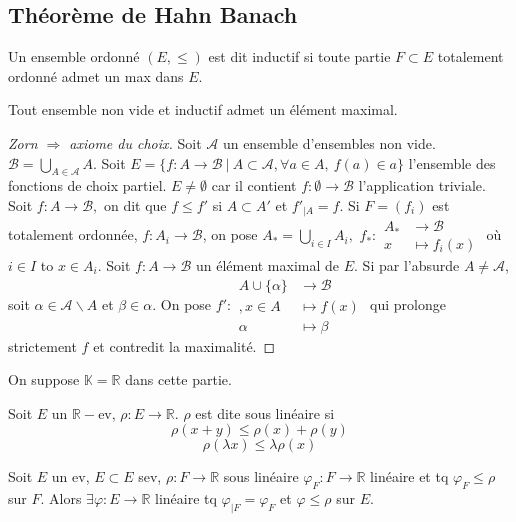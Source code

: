 \subsection{Théorème de Hahn Banach}
\begin{definition}
    Un ensemble ordonné $(E,\le )$ est dit inductif si toute partie $F\subset E$ totalement ordonné admet un max dans $E.$
\end{definition}
\begin{lemme}[Zorn]
    Tout ensemble non vide et inductif admet un élément maximal.
\end{lemme}
\begin{proof}[Zorn $\Rightarrow$ axiome du choix]
    Soit $\mathcal{A}$ un ensemble d'ensembles non vide. $\mathcal{B}=\bigcup\limits_{A\in \mathcal{A}} A$. Soit $E=\{f:A\to \mathcal{B}\ |\ A\subset \mathcal{A},\forall a\in A,\ f(a)\in a \} $ l'ensemble des fonctions de choix partiel. $E\neq \emptyset $ car il contient $f:\emptyset \to \mathcal{B}$ l'application triviale.\\
    Soit $f:A\to \mathcal{B},$ on dit que $f\le f'$ si $A\subset A'$ et $f'_{|A}=f.$ Si $F=\left( f_i \right) $ est totalement ordonnée, $f:A_i\to \mathcal{B}$, on pose $A_*=\bigcup\limits_{i\in I} A_i,$ $f_* :\begin{aligned}
        A_* &\longrightarrow \mathcal{B} \\
        x &\longmapsto f_i(x)
    \end{aligned}$ où $i\in I$ to $x\in A_i.$ Soit $f:A\to \mathcal{B}$ un élément maximal de $E.$ Si par l'absurde $A\neq \mathcal{A}$, soit $\alpha\in \mathcal{A}\backslash A$ et $\beta\in \alpha .$ On pose $f' :\begin{aligned}
        A\cup \{\alpha\}  &\longrightarrow \mathcal{B} \\
        ,x\in A &\longmapsto f(x)\\
        \alpha &\longmapsto \beta
    \end{aligned}$ qui prolonge strictement $f$ et contredit la maximalité.
\end{proof}
On suppose $\mathbb{K}=\mathbb{R} $ dans cette partie.
\begin{definition}
    Soit $E$ un $\mathbb{R} -$ev, $\rho:E\to \mathbb{R} $. $\rho$ est dite sous linéaire si
    $$\rho(x+y)\le \rho(x)+\rho(y)$$
    $$\rho(\lambda x)\le \lambda\rho(x)$$

\end{definition}
\begin{ex}
    Soit $E$ un ev, $E\subset E$ sev, $\rho:F\to \mathbb{R} $ sous linéaire $\varphi _F:F\to \mathbb{R} $ linéaire et tq $\varphi _F\le \rho$ sur $F.$ Alors $\exists \varphi :E\to \mathbb{R}$ linéaire tq $\varphi _{|F}=\varphi _F$ et $\varphi \le \rho$ sur $E.$
\end{ex}

